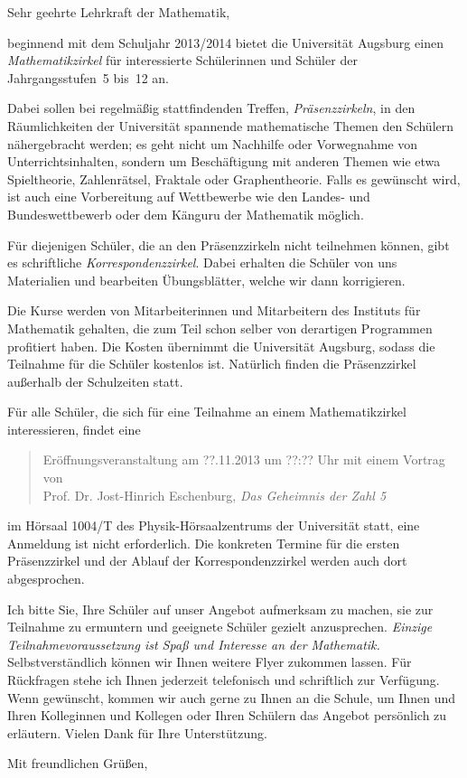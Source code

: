 \documentclass{zirkelbrief}
\begin{document}
\renewcommand{\anschrift}{%
      Holbein-Gymnasium Augsburg \\
      Fachbereich Mathematik \\
      Hallstraße 10 \\
      86150 Augsburg}
\renewcommand{\datum}{2.9.2013}
\renewcommand{\betreff}{Matheschülerzirkel der Universität Augsburg}

\makeletterhead

Sehr geehrte Lehrkraft der Mathematik,

beginnend mit dem Schuljahr 2013/2014 bietet die Universität Augsburg
einen \emph{Mathe\-matik\-zir\-kel} für interessierte Schülerinnen und Schüler der
Jahrgangsstufen~5 bis~12 an.

Dabei sollen bei regelmäßig stattfindenden Treffen, \emph{Präsenzzirkeln}, in
den Räumlichkeiten der Universität spannende mathematische Themen den Schülern
nähergebracht werden; es geht nicht um Nachhilfe oder Vorwegnahme von
Unterrichtsinhalten, sondern um Beschäftigung mit anderen Themen wie etwa
Spieltheorie, Zahlenrätsel, Fraktale oder Graphentheorie. Falls es gewünscht
wird, ist auch eine Vorbereitung auf Wettbewerbe wie den Landes- und
Bundeswettbewerb oder dem Känguru der Mathematik möglich.

Für diejenigen Schüler, die an den Präsenzzirkeln nicht teilnehmen können, gibt
es schriftliche \emph{Korrespondenzzirkel}. Dabei erhalten die Schüler von uns
Materialien und bearbeiten Übungsblätter, welche wir dann korrigieren.

Die Kurse werden von Mitarbeiterinnen und Mitarbeitern des Instituts für
Mathematik gehalten, die zum Teil schon selber von derartigen Programmen
profitiert haben. Die Kosten übernimmt die Universität Augsburg, sodass die
Teilnahme für die Schüler kostenlos ist. Natürlich finden die Präsenzzirkel
außerhalb der Schulzeiten statt.

Für alle Schüler, die sich für eine Teilnahme an einem Mathematikzirkel
interessieren, findet eine
\begin{quote}
    Eröffnungsveranstaltung am ??.11.2013 um ??:?? Uhr mit einem Vortrag von \\
    Prof. Dr. Jost-Hinrich Eschenburg, \emph{Das
    Geheimnis der Zahl 5}
\end{quote}
im Hörsaal 1004/T des Physik-Hörsaalzentrums der Universität statt, eine
Anmeldung ist nicht erforderlich. Die konkreten Termine für die
ersten Präsenzzirkel und der Ablauf der Korrespondenzzirkel werden auch dort
abgesprochen.

Ich bitte Sie, Ihre Schüler auf unser Angebot aufmerksam zu machen, sie zur
Teilnahme zu ermuntern und geeignete Schüler gezielt
anzusprechen. \emph{Einzige Teilnahmevoraussetzung ist Spaß und
Interesse an der Mathematik.} Selbstverständlich können wir Ihnen weitere Flyer
zukommen lassen. Für Rückfragen stehe ich Ihnen jederzeit
telefonisch und schriftlich zur Verfügung. Wenn gewünscht, kommen wir auch
gerne zu Ihnen an die Schule, um Ihnen und Ihren Kolleginnen und Kollegen oder
Ihren Schülern das Angebot persönlich zu erläutern. Vielen Dank für Ihre
Unterstützung.

Mit freundlichen Grüßen,
\end{document}
